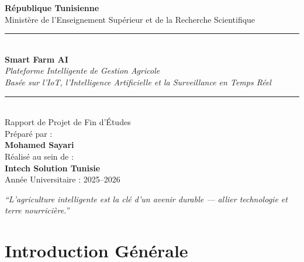 \documentclass[12pt, a4paper]{report}
\begin{document}
\begin{titlepage}
\begin{center}
    \vspace*{1cm}
    {\Large \textbf{République Tunisienne}}\\[0.3cm]
    {\large Ministère de l'Enseignement Supérieur et de la Recherche Scientifique}\\[1.5cm]

    \rule{\textwidth}{1.5pt}\\[0.4cm]
    {\huge \textbf{\textcolor{primary}{Smart Farm AI}}}\\[0.3cm]
    {\Large \textit{Plateforme Intelligente de Gestion Agricole}}\\
    {\large \textit{Basée sur l'IoT, l'Intelligence Artificielle et la Surveillance en Temps Réel}}\\[0.3cm]
    \rule{\textwidth}{1.5pt}\\[1.5cm]

    {\large Rapport de Projet de Fin d'Études}\\[0.5cm]
    {\large Préparé par :}\\[0.3cm]
    {\Large \textbf{Mohamed Sayari}}\\[1.5cm]

    {\large Réalisé au sein de :}\\[0.3cm]
    {\Large \textbf{Intech Solution Tunisie}}\\[1.5cm]

    {\large Année Universitaire : 2025--2026}\\[1cm]

    \vfill
    \begin{tcolorbox}[colback=primary!10, colframe=primary, width=0.85\textwidth]
    \centering
    \textit{``L'agriculture intelligente est la clé d'un avenir durable — allier technologie et terre nourricière.''}
    \end{tcolorbox}
\end{center}
\end{titlepage}

\tableofcontents
\listoffigures
\listoftables

\clearpage

\chapter*{Introduction Générale}
\end{document}
